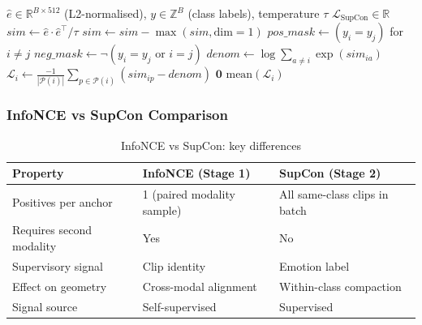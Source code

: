 \documentclass[12pt,a4paper]{article}
\theoremstyle{definition}
\theoremstyle{remark}
\begin{document}
\begin{algorithm}[H]
\caption{Supervised Contrastive Loss (SupCon)}
\label{alg:supcon}
\begin{algorithmic}[1]
\Require $\hat{e} \in \mathbb{R}^{B \times 512}$ (L2-normalised),
         $y \in \mathbb{Z}^B$ (class labels), temperature $\tau$
\Ensure $\mathcal{L}_{\text{SupCon}} \in \mathbb{R}$
\State $\textit{sim} \gets \hat{e} \cdot \hat{e}^\top / \tau$
\State $\textit{sim} \gets \textit{sim} - \max(\textit{sim}, \text{dim}=1)$
\State $\textit{pos\_mask} \gets (y_i = y_j)$ for $i \neq j$
\State $\textit{neg\_mask} \gets \neg(y_i = y_j \text{ or } i=j)$
  \State $\textit{denom} \gets \log\sum_{a \neq i} \exp(\textit{sim}_{ia})$
  \State $\mathcal{L}_i \gets \frac{-1}{|\mathcal{P}(i)|}
    \sum_{p \in \mathcal{P}(i)} (\textit{sim}_{ip} - \textit{denom})$
\EndFor
{}
  \State \Return $\mathbf{0}$ 
\EndIf
\State \Return $\text{mean}(\mathcal{L}_i)$
\end{algorithmic}
\end{algorithm}

\subsubsection{InfoNCE vs SupCon Comparison}

\begin{table}[H]
\centering
\caption{InfoNCE vs SupCon: key differences}
\begin{tabularx}{\textwidth}{lXX}
\toprule
Property & InfoNCE (Stage 1) & SupCon (Stage 2) \\
\midrule
Positives per anchor & 1 (paired modality sample) & All same-class clips in batch \\
Requires second modality & Yes & No \\
Supervisory signal & Clip identity & Emotion label \\
Effect on geometry & Cross-modal alignment & Within-class compaction \\
Signal source & Self-supervised & Supervised \\
\bottomrule
\end{tabularx}
\end{table}

\end{document}
